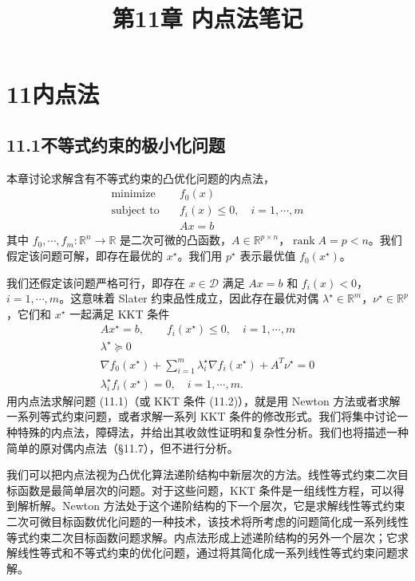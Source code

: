 \documentclass[UTF8,12pt,a4paper,fontset=fandol]{ctexart}
\title{第11章 内点法笔记}
\author{}
\date{}
\begin{document}
\maketitle

\section*{11\quad 内点法}

\subsection*{11.1\quad 不等式约束的极小化问题}

本章讨论求解含有不等式约束的凸优化问题的内点法，
\begin{equation}
\begin{aligned}
\text{minimize}\quad & f_0(x)\\
\text{subject to}\quad & f_i(x)\leq 0,\quad i=1,\cdots,m\\
& Ax=b
\end{aligned}
\tag{11.1}
\end{equation}
其中 $f_0,\cdots,f_m:\mathbb{R}^n\to\mathbb{R}$ 是二次可微的凸函数，$A\in\mathbb{R}^{p\times n}$，$\operatorname{rank}A=p<n$。我们假定该问题可解，即存在最优的 $x^\star$。我们用 $p^\star$ 表示最优值 $f_0(x^\star)$。

我们还假定该问题严格可行，即存在 $x\in\mathcal{D}$ 满足 $Ax=b$ 和 $f_i(x)<0$，$i=1,\cdots,m$。这意味着 Slater 约束品性成立，因此存在最优对偶 $\lambda^\star\in\mathbb{R}^m$，$\nu^\star\in\mathbb{R}^p$，它们和 $x^\star$ 一起满足 KKT 条件
\begin{equation}
\begin{gathered}
Ax^\star=b,\qquad f_i(x^\star)\leq 0,\quad i=1,\cdots,m\\
\lambda^\star\succeq 0\\
\nabla f_0(x^\star)+\sum_{i=1}^m\lambda_i^\star\nabla f_i(x^\star)+A^T\nu^\star=0\\
\lambda_i^\star f_i(x^\star)=0,\quad i=1,\cdots,m.
\end{gathered}
\tag{11.2}
\end{equation}
用内点法求解问题 (11.1)（或 KKT 条件 (11.2)），就是用 Newton 方法或者求解一系列等式约束问题，或者求解一系列 KKT 条件的修改形式。我们将集中讨论一种特殊的内点法，障碍法，并给出其收敛性证明和复杂性分析。我们也将描述一种简单的原对偶内点法（\S11.7），但不进行分析。

我们可以把内点法视为凸优化算法递阶结构中新层次的方法。线性等式约束二次目标函数是最简单层次的问题。对于这些问题，KKT 条件是一组线性方程，可以得到解析解。Newton 方法处于这个递阶结构的下一个层次，它是求解线性等式约束二次可微目标函数优化问题的一种技术，该技术将所考虑的问题简化成一系列线性等式约束二次目标函数问题求解。内点法形成上述递阶结构的另外一个层次；它求解线性等式和不等式约束的优化问题，通过将其简化成一系列线性等式约束问题求解。
\end{document}

